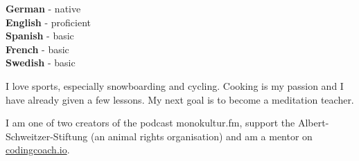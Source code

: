 \documentclass[9pt]{developercv} %
\begin{document}

\begin{minipage}[t]{0.3\textwidth}
	\vspace{-\baselineskip} %

	
	\textbf{German} - native\\
	\textbf{English} - proficient\\
	\textbf{Spanish} - basic\\
	\textbf{French} - basic\\
	\textbf{Swedish} - basic
\end{minipage}
\hfill
\begin{minipage}[t]{0.3\textwidth}
	\vspace{-\baselineskip} %
	
	
  I love sports, especially snowboarding and cycling.
  Cooking is my passion and I have already given a few lessons.
  My next goal is to become a meditation teacher.
\end{minipage}
\hfill
\begin{minipage}[t]{0.3\textwidth}
	\vspace{-\baselineskip} %
	
  
  I am one of two creators of the podcast monokultur.fm,
  support the Albert-Schweitzer-Stiftung (an animal rights organisation)
  and am a mentor on \href{https://mentors.codingcoach.io/}{codingcoach.io}.
\end{minipage}



\end{document}
